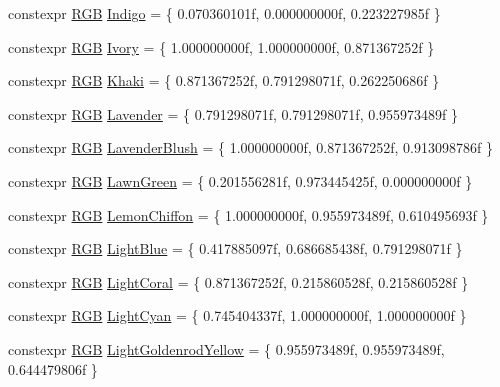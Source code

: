 \begin{DoxyCompactItemize}
\item 
constexpr \hyperlink{structmage_1_1_r_g_b}{R\+GB} \hyperlink{namespacemage_1_1color_a6c11642f5d2e292242db7ae8098ad2fe}{Indigo} = \{ 0.\+070360101f, 0.\+000000000f, 0.\+223227985f \}
\item 
constexpr \hyperlink{structmage_1_1_r_g_b}{R\+GB} \hyperlink{namespacemage_1_1color_a523d55e266b6dd337cd2865ee29754fc}{Ivory} = \{ 1.\+000000000f, 1.\+000000000f, 0.\+871367252f \}
\item 
constexpr \hyperlink{structmage_1_1_r_g_b}{R\+GB} \hyperlink{namespacemage_1_1color_a2be9259999ab5e4e4e3c46c0c12cd5d7}{Khaki} = \{ 0.\+871367252f, 0.\+791298071f, 0.\+262250686f \}
\item 
constexpr \hyperlink{structmage_1_1_r_g_b}{R\+GB} \hyperlink{namespacemage_1_1color_aa245a4aee08d18691655685f3918491d}{Lavender} = \{ 0.\+791298071f, 0.\+791298071f, 0.\+955973489f \}
\item 
constexpr \hyperlink{structmage_1_1_r_g_b}{R\+GB} \hyperlink{namespacemage_1_1color_a1931b51916699fe6043528085a744912}{Lavender\+Blush} = \{ 1.\+000000000f, 0.\+871367252f, 0.\+913098786f \}
\item 
constexpr \hyperlink{structmage_1_1_r_g_b}{R\+GB} \hyperlink{namespacemage_1_1color_abb5025143228ccad532fc59bc3e0326c}{Lawn\+Green} = \{ 0.\+201556281f, 0.\+973445425f, 0.\+000000000f \}
\item 
constexpr \hyperlink{structmage_1_1_r_g_b}{R\+GB} \hyperlink{namespacemage_1_1color_a978bfddad2cebc2e3016ae777e2c420d}{Lemon\+Chiffon} = \{ 1.\+000000000f, 0.\+955973489f, 0.\+610495693f \}
\item 
constexpr \hyperlink{structmage_1_1_r_g_b}{R\+GB} \hyperlink{namespacemage_1_1color_a1890b43e1d4774c83e7cf5a4dcbf9c65}{Light\+Blue} = \{ 0.\+417885097f, 0.\+686685438f, 0.\+791298071f \}
\item 
constexpr \hyperlink{structmage_1_1_r_g_b}{R\+GB} \hyperlink{namespacemage_1_1color_ad8d2691e5afda566e2310392eff4d591}{Light\+Coral} = \{ 0.\+871367252f, 0.\+215860528f, 0.\+215860528f \}
\item 
constexpr \hyperlink{structmage_1_1_r_g_b}{R\+GB} \hyperlink{namespacemage_1_1color_a33ec927401f051a6271841f78e67564f}{Light\+Cyan} = \{ 0.\+745404337f, 1.\+000000000f, 1.\+000000000f \}
\item 
constexpr \hyperlink{structmage_1_1_r_g_b}{R\+GB} \hyperlink{namespacemage_1_1color_a60013d7d47356017384ab70bf9a6e1ac}{Light\+Goldenrod\+Yellow} = \{ 0.\+955973489f, 0.\+955973489f, 0.\+644479806f \}
\item 

\end{DoxyCompactItemize}
